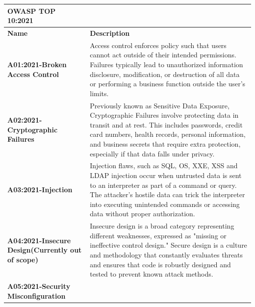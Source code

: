 \documentclass{article}
\begin{document}
                \begin{center}
                \begin{longtable} {|>{\raggedright\arraybackslash}p{10em}|p{30em}|}
                \hline
                \multicolumn{2}{|p{41em}|} {\cellcolor{tablecol}\textbf{OWASP TOP 10:2021}} \\
                \hline
                \large \cellcolor{tableco2} \textbf{Name} & \large \cellcolor{tableco2} \textbf{Description} \\
                \hline
                \normalsize \textbf{A01:2021-Broken Access Control} & 
                \normalsize Access control enforces policy such that users cannot act outside of their intended
                permissions. Failures typically lead to unauthorized information disclosure, modification,
                or destruction of all data or performing a business function outside the user's limits. \\
                \hline
                \normalsize \textbf{A02:2021-Cryptographic Failures} & 
                \normalsize Previously known as Sensitive Data Exposure, Cryptographic Failures involve protecting
                data in transit and at rest. This includes passwords, credit card numbers, health records,
                personal information, and business secrets that require extra protection, especially if that
                data falls under privacy. \\
                \hline
                \normalsize \textbf{A03:2021-Injection} & 
                \normalsize Injection flaws, such as SQL, OS, XXE, XSS and LDAP injection occur when untrusted
                data is sent to an interpreter as part of a command or query. The attacker's hostile data
                can trick the interpreter into executing unintended commands or accessing data without
                proper authorization. \\
                \hline
                \normalsize \textbf{A04:2021-Insecure Design(Currently out of scope) } & 
                \normalsize Insecure design is a broad category representing different weaknesses, expressed as
                "missing or ineffective control design." Secure design is a culture and methodology that
                constantly evaluates threats and ensures that code is robustly designed and tested to
                prevent known attack methods. \\
                \hline
                \normalsize \textbf{A05:2021-Security Misconfiguration} & 

\end{longtable}
\end{center}
\end{document}
